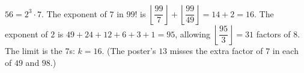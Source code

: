 $56=2^3\cdot7$. The exponent of $7$ in $99!$ is $\left\lfloor\dfrac{99}{7}\right\rfloor+\left\lfloor\dfrac{99}{49}\right\rfloor=14+2=16$. The exponent of $2$ is $49+24+12+6+3+1=95$, allowing $\left\lfloor\dfrac{95}{3}\right\rfloor=31$ factors of $8$. The limit is the $7$s: $k=\boxed{16}$. (The poster's $13$ misses the extra factor of $7$ in each of $49$ and $98$.)
